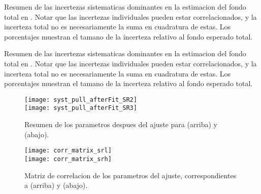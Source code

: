 

\begin{table}[!htbp]
  \centering

  \caption{Resumen de las incertezas sistematicas dominantes en la estimacion del fondo total
    en {\SRL}. Notar que las incertezas individuales pueden estar correlacionados, y la incerteza
    total no es necesariamente la suma en cuadratura de estas. Los porcentajes muestran el tamano
    de la incerteza relativo al fondo esperado total.}
  \label{tab:fit_result_srl_syst}

  
\end{table}

\begin{table}[!htbp]
  \centering

  \caption{Resumen de las incertezas sistematicas dominantes en la estimacion del fondo total
    en {\SRH}. Notar que las incertezas individuales pueden estar correlacionados, y la incerteza
    total no es necesariamente la suma en cuadratura de estas. Los porcentajes muestran el tamano
    de la incerteza relativo al fondo esperado total.}
  \label{tab:fit_result_srh_syst}

  

\end{table}




\begin{figure}[!htbp]
  \centering

  \texttt{[image: syst\_pull\_afterFit\_SR2]} \\
  \texttt{[image: syst\_pull\_afterFit\_SR3]}

  \caption{Resumen de los parametros despues del ajuste para {\SRL} (arriba) y {\SRH} (abajo).}
  \label{fig:fit_unc_nuisance_SR}

\end{figure}

\begin{figure}[!htbp]
  \centering

  \texttt{[image: corr\_matrix\_srl]} \\
  \texttt{[image: corr\_matrix\_srh]} \\

  \caption{Matriz de correlacion de los parametros del ajuste, correspondientes a {\SRL} (arriba) y {\SRH} (abajo).}
  \label{fig:fit_corr_SR}

\end{figure}



